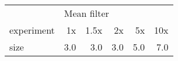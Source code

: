 \begin{tabular}{lrrrrr}
\toprule
{} & \multicolumn{5}{l}{Mean filter} \\
experiment &          1x & 1.5x &   2x &   5x &  10x \\
\midrule
size &         3.0 &  3.0 &  3.0 &  5.0 &  7.0 \\
\bottomrule
\end{tabular}
